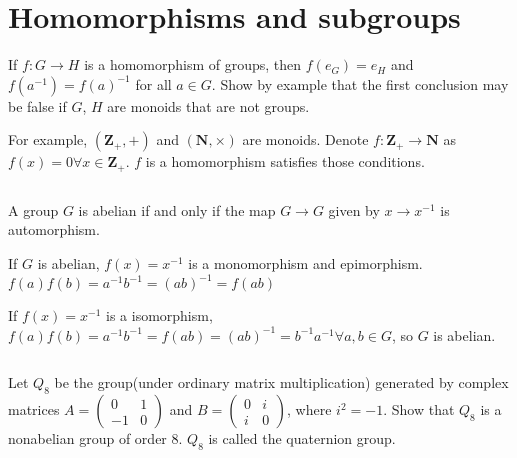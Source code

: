 \section{Homomorphisms and subgroups}
\begin{ex}
    If $f: G \to H$ is a homomorphism of groups, then $f(e_G) = e_H$ and $f(a^{-1}) = f(a)^{-1}$ for all $a \in G$. Show by example that the first conclusion may be false if $G$, $H$ are monoids that are not groups.
\end{ex}

\begin{answer}
    For example, $(\mathbf{Z_+,+})$ and $(\mathbf{N},\times)$ are monoids. Denote $f:\mathbf{Z_+}\to \mathbf{N}$ as $f(x)=0 \forall x \in \mathbf{Z_+}$. $f$ is a homomorphism satisfies those conditions.
\end{answer}

$$ $$

\begin{ex}
    A group $G$ is abelian if and only if the map $G\to G$ given by $x\to x^{-1}$ is automorphism.
\end{ex}

\begin{answer}
    If $G$ is abelian, $f(x)=x^{-1}$ is a monomorphism and epimorphism. $f(a)f(b)=a^{-1}b^{-1}=(ab)^{-1}=f(ab)$

    If $f(x)=x^{-1}$ is a isomorphism, $f(a)f(b)=a^{-1}b^{-1}=f(ab)=(ab)^{-1}=b^{-1}a^{-1} \forall a,b\in G$, so $G$ is abelian.
\end{answer}

$$ $$

\begin{ex}
    Let $Q_8$ be the group(under ordinary matrix multiplication) generated by complex matrices $A = \begin{pmatrix}
        0 & 1 \\
        -1 & 0
    \end{pmatrix}$ and $B = \begin{pmatrix}
        0 & i\\
        i & 0
    \end{pmatrix}$, where $i^{2}=-1$. Show that $Q_8$ is a nonabelian group of order 8. $Q_8$ is called the quaternion group.
\end{ex}

